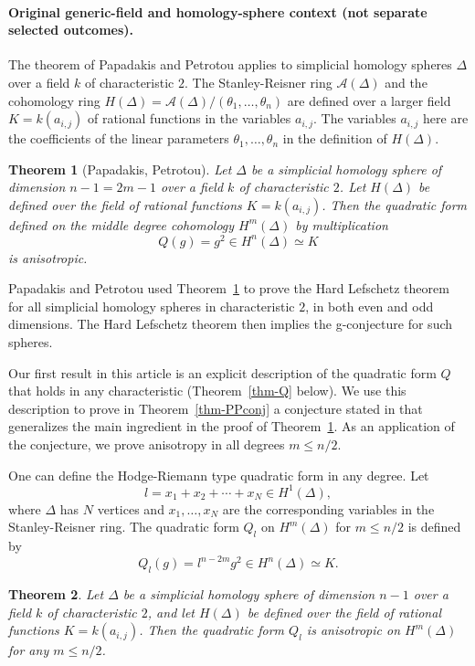 \documentclass[10pt]{article}
\newtheorem{theorem}{Theorem}[section]
\theoremstyle{definition}
\newcommand{\cA}{{\mathcal A}}
\newcommand{\isom}{\simeq}
\renewcommand{\a}[1]{a_{#1}}
\begin{document}
\paragraph{Original generic-field and homology-sphere context (not separate selected outcomes).}
The theorem of Papadakis and Petrotou applies to simplicial homology spheres $\Delta$ over a field $k$ of characteristic $2$. The Stanley-Reisner ring $\cA(\Delta)$ and the cohomology ring $H(\Delta) = \cA(\Delta)/(\theta_1,\ldots,\theta_n)$ are defined over a larger field $K=k(\a{i,j})$ of rational functions in the variables $\a{i,j}$. The variables $\a{i,j}$ here are the coefficients of the linear parameters $\theta_1,\ldots, \theta_n$ in the definition of $H(\Delta)$. 

\begin{theorem}[Papadakis, Petrotou] \label{thm-PP}
Let $\Delta$ be a simplicial homology sphere of dimension $n-1=2m-1$ over a field $k$ of characteristic $2$. Let $H(\Delta)$ be defined over the field of rational functions $K=k(\a{i,j})$. Then the quadratic form defined on the middle degree cohomology $H^m(\Delta)$ by multiplication 
\[ Q(g) = g^2 \in H^{n}(\Delta) \isom K\]
 is anisotropic.
\end{theorem}

Papadakis and Petrotou used Theorem~\ref{thm-PP}  to prove the Hard Lefschetz theorem for all simplicial homology spheres in characteristic $2$,  in both even and odd dimensions. The Hard Lefschetz theorem then implies the g-conjecture for such spheres. 

Our first result in this article is an explicit description of the quadratic form $Q$ that holds in any characteristic (Theorem~\ref{thm-Q} below). We use this description to prove in Theorem~\ref{thm-PPconj} a conjecture stated in \cite{PapadakisPetrotou} that generalizes the main ingredient in the proof of Theorem~\ref{thm-PP}. As an application of the conjecture, we prove anisotropy in all degrees $m\leq n/2$.

One can define the Hodge-Riemann type quadratic form in any degree. Let
\[ l = x_1 + x_2 + \cdots + x_N \in H^1(\Delta),\]
where $\Delta$ has $N$ vertices and $x_1,\ldots, x_N$ are the corresponding variables in the Stanley-Reisner ring. 
The quadratic form $Q_l$ on $H^m(\Delta)$ for $m\leq n/2$ is defined by
\[ Q_l(g) = l^{n-2m} g^2 \in H^n(\Delta) \isom K.\]

\begin{theorem} \label{thm-lef}
Let $\Delta$ be a simplicial homology sphere of dimension $n-1$ over a field $k$ of characteristic $2$, and let $H(\Delta)$ be defined over the field of rational functions $K=k(\a{i,j})$. Then the quadratic form $Q_l$ is anisotropic on $H^m(\Delta)$ for any $m\leq n/2$. 
\end{theorem}
\end{document}

